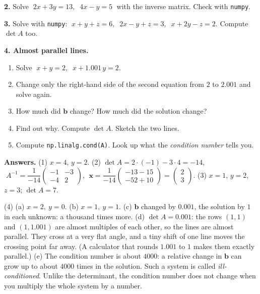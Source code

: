 \documentclass[11pt,a4paper]{article}
\begin{document}
\textbf{2.} Solve $\;2x + 3y = 13,\;\; 4x - y = 5\;$ with the inverse matrix. Check with \texttt{numpy}.

\textbf{3.} Solve with \texttt{numpy}: $\;x + y + z = 6,\;\; 2x - y + z = 3,\;\; x + 2y - z = 2$.
Compute $\det A$ too.

\textbf{4. Almost parallel lines.}
\begin{enumerate}[label=(\alph*), itemsep=1pt, topsep=2pt]
  \item Solve $\;x + y = 2,\;\; x + 1.001\,y = 2$.
  \item Change only the right-hand side of the second equation from $2$ to $2.001$ and solve again.
  \item How much did $\mathbf b$ change? How much did the solution change?
  \item Find out why. Compute $\det A$. Sketch the two lines.
  \item Compute \texttt{np.linalg.cond(A)}. Look up what the \emph{condition number} tells you.
\end{enumerate}

\textbf{Answers.}
(1) $x = 4$, $y = 2$.
(2) $\det A = 2 \cdot (-1) - 3 \cdot 4 = -14$, $\;A^{-1} = \dfrac{1}{-14}\begin{pmatrix} -1 & -3\\ -4 & 2 \end{pmatrix}$,
$\;\mathbf x = \dfrac{1}{-14}\begin{pmatrix} -13 - 15\\ -52 + 10 \end{pmatrix} = \begin{pmatrix} 2\\ 3 \end{pmatrix}$.
(3) $x = 1$, $y = 2$, $z = 3$; $\det A = 7$.

(4) (a) $x = 2,\ y = 0$. (b) $x = 1,\ y = 1$. (c) $\mathbf b$ changed by $0.001$, the solution by $1$ in each unknown:
a thousand times more. (d) $\det A = 0.001$: the rows $(1, 1)$ and $(1, 1.001)$ are almost multiples of each other, so the
lines are almost parallel. They cross at a very flat angle, and a tiny shift of one line moves the crossing point far
away. (A calculator that rounds $1.001$ to $1$ makes them exactly parallel.) (e) The condition number is about $4000$:
a relative change in $\mathbf b$ can grow up to about $4000$ times in the solution. Such a system is called
\emph{ill-conditioned}. Unlike the determinant, the condition number does not change when you multiply the whole system
by a number.
\end{document}
